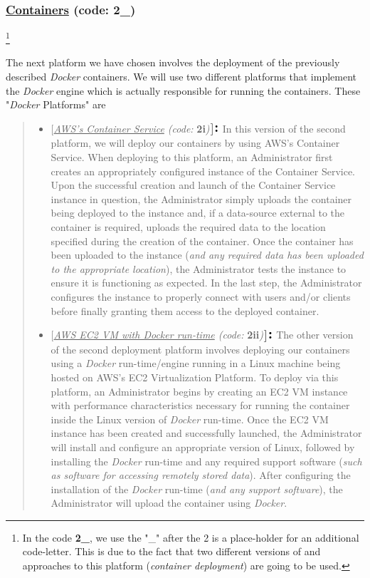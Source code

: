 \subsubsection{\underline{Containers} (code: \textbf{2\_})}\footnote{In the code \textbf{2\_}, we use the "\_" after the 2 is a place-holder for an additional code-letter.  This is due to the fact that two different versions of and approaches to this platform (\emph{container deployment}) are going to be used.}

The next platform we have chosen involves the deployment of the previously described \emph{Docker} containers.  We will use two different platforms that implement the \emph{Docker} engine which is actually responsible for running the containers.  These "\emph{Docker} Platforms" are

\begin{quote}
\begin{itemize}
	\vspace{0.05in}
	\item $\bigl[$\normalsize{\emph{\underline{AWS's Container Service} (code:} \textbf{2i}\emph{)}}$\bigr]\text{\Large{\textbf{:}}}$ In this version of the second platform, we will deploy our containers by using AWS's Container Service.  When deploying to this platform, an Administrator first creates an appropriately configured instance of the Container Service.  Upon the successful creation and launch of the Container Service instance in question, the Administrator simply uploads the container being deployed to the instance and, if a data-source external to the container is required, uploads the required data to the location specified during the creation of the container.  Once the container has been uploaded to the instance (\emph{and any required data has been uploaded to the appropriate location}), the Administrator tests the instance to ensure it is functioning as expected.  In the last step, the Administrator configures the instance to properly connect with users and/or clients before finally granting them access to the deployed container. 
	\vspace{0.075in}
	\item $\bigl[$\normalsize{\emph{\underline{AWS EC2 VM with Docker run-time} (code:} \textbf{2ii}\emph{)}}$\bigr] \text{\Large{\textbf{:}}}$ The other version of the second deployment platform involves deploying our containers using a \emph{Docker} run-time/engine running in a Linux machine being hosted on AWS's EC2 Virtualization Platform.  To deploy via this platform, an Administrator begins by creating an EC2 VM instance with performance characteristics necessary for running the container inside the Linux version of \emph{Docker} run-time.  Once the EC2 VM instance has been created and successfully launched, the Administrator will install and configure an appropriate version of Linux, followed by installing the \emph{Docker} run-time and any required support software (\emph{such as software for accessing remotely stored data}).  After configuring the installation of the \emph{Docker} run-time (\emph{and any support software}), the Administrator will upload the container using \emph{Docker}.  


\end{itemize}
\end{quote}
